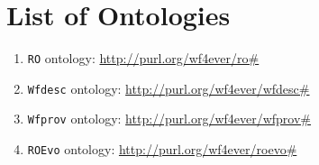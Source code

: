 \section*{List of Ontologies}
\begin{enumerate}
\item
\texttt{RO} ontology: \url{http://purl.org/wf4ever/ro#}
\item
\texttt{Wfdesc} ontology: \url{http://purl.org/wf4ever/wfdesc#}
\item
\texttt{Wfprov} ontology: \url{http://purl.org/wf4ever/wfprov#}
\item
\texttt{ROEvo} ontology: \url{http://purl.org/wf4ever/roevo#}
\end{enumerate}